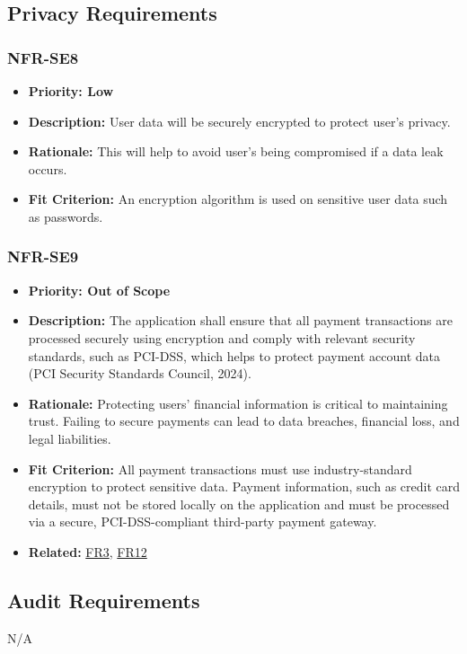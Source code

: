 \documentclass[12pt]{article}
\begin{document}
\subsection{Privacy Requirements}
\subsubsection*{NFR-SE8}
\label{sec:SE8}
\begin{itemize}
  \item \textbf{Priority: Low}
  \item \textbf{Description:} User data will be securely encrypted to protect user’s privacy.
  \item \textbf{Rationale:} This will help to avoid user's being compromised if a data leak occurs.
  \item \textbf{Fit Criterion:} An encryption algorithm is used on sensitive user data such as passwords.
\end{itemize}
\subsubsection*{NFR-SE9}
\label{sec:SE9}
\begin{itemize}
  \item \textbf{Priority: Out of Scope}
  \item \textbf{Description:} The application shall ensure that all payment transactions are processed securely using encryption and comply with relevant security standards, such as PCI-DSS, which helps to protect payment account data (PCI Security Standards Council, 2024).
  \item \textbf{Rationale:} Protecting users' financial information is critical to maintaining trust. Failing to secure payments can lead to data breaches, financial loss, and legal liabilities.
  \item \textbf{Fit Criterion:} All payment transactions must use industry-standard encryption to protect sensitive data. Payment information, such as credit card details, must not be stored locally on the application and must be processed via a secure, PCI-DSS-compliant third-party payment gateway.
  \item \textbf{Related:} \hyperref[sec:FR3]{FR3}, \hyperref[sec:FR12]{FR12}
\end{itemize}

\subsection{Audit Requirements}
N/A
\end{document}
